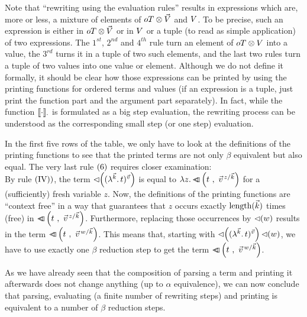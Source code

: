 \documentclass[submission,copyright,creativecommons]{eptcs}
\begin{document}
Note that ``rewriting using the evaluation rules'' results in expressions which are, more or less, a mixture of elements of $\ot \otimes \vl$ and $\va$. To be precise, such an expression is either in $\ot \otimes \vl$ or in $\va$ or a tuple (to read as simple application) of two expressions. The $1^{st}$, $2^{nd}$ and $4^{th}$ rule turn an element of $\ot \otimes \va$ into a value, the $3^{rd}$ turns it in a tuple of two such elements, and the last two rules turn a tuple of two values into one value or element. 
Although we do not define it formally, it should be clear how those expressions can be printed by using the printing functions for ordered terms and values (if an expression is a tuple, just print the function part and the argument part separately). In fact, while the function $\ev \cdot \cdot$ is formulated as a big step evaluation, the rewriting process can be understood as the corresponding small step (or one step) evaluation.

In the first five rows of the table, we only have to look at the definitions of the printing functions to see that the printed terms are not only $\beta$ equivalent but also equal. The very last rule $\lab 6$ requires closer examination: 
\\
By rule $\lab {IV})$, the term $\prVal{\Val{\vec k} t {\vec v}}$ is equal to $\LaA z {\pr {t} {  \multiinsert{\vec v}{\vec k}{z}   }} $ for a (sufficiently) fresh variable $z$. Now, the definitions of the printing functions are ``context free'' in a way that guarantees  that $z$ occurs exactly $\length{\vec k}$ times (free) in $\pr {t} {  \multiinsert{\vec v}{\vec k}{z}   }$. Furthermore, replacing those occurrences by $\prVal{w}$ results in the term $\pr{t}{\multiinsert{\vec v}{\vec k}{w}}$. This means that, starting with 
$ \ApA{\prVal{\Val{\vec k} t {\vec v}}}{\prVal w}  $,
we have to use exactly one $\beta$ reduction step to get the term $  \pr{t}{\multiinsert{\vec v}{\vec k}{w}}  $.

As we have already seen that the composition of parsing a term and printing it afterwards does not change anything (up to $\alpha$ equivalence), we can now conclude that parsing, evaluating (a finite number of rewriting steps) and printing is equivalent to a number of $\beta$ reduction steps.
\end{document}
